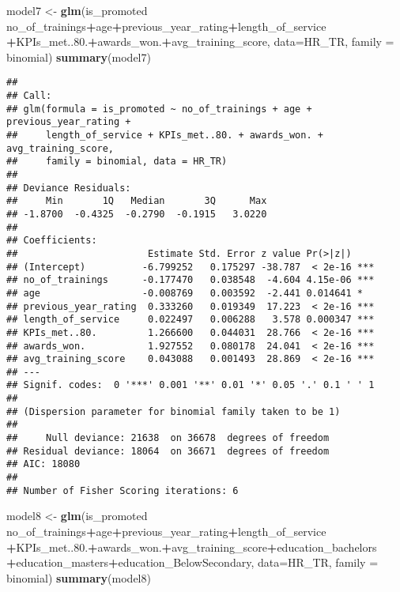 \documentclass[
]{article}
\newenvironment{Shaded}{\begin{snugshade}}{\end{snugshade}}
\newcommand{\DataTypeTok}[1]{\textcolor[rgb]{0.13,0.29,0.53}{#1}}
\newcommand{\FloatTok}[1]{\textcolor[rgb]{0.00,0.00,0.81}{#1}}
\newcommand{\KeywordTok}[1]{\textcolor[rgb]{0.13,0.29,0.53}{\textbf{#1}}}
\newcommand{\NormalTok}[1]{#1}
\newcommand{\OperatorTok}[1]{\textcolor[rgb]{0.81,0.36,0.00}{\textbf{#1}}}
\newcommand{\StringTok}[1]{\textcolor[rgb]{0.31,0.60,0.02}{#1}}
\begin{document}
\begin{Shaded}
\begin{Highlighting}[]
\NormalTok{model7 <-}\StringTok{ }\KeywordTok{glm}\NormalTok{(is_promoted }\OperatorTok{~}\StringTok{ }\NormalTok{no_of_trainings}\OperatorTok{+}\NormalTok{age}\OperatorTok{+}\NormalTok{previous_year_rating}\OperatorTok{+}\NormalTok{length_of_service}
              \OperatorTok{+}\NormalTok{KPIs_met..}\FloatTok{80.}\OperatorTok{+}\NormalTok{awards_won.}\OperatorTok{+}\NormalTok{avg_training_score, }
              \DataTypeTok{data=}\NormalTok{HR_TR, }\DataTypeTok{family =}\NormalTok{ binomial)}
\KeywordTok{summary}\NormalTok{(model7)}
\end{Highlighting}
\end{Shaded}

\begin{verbatim}
## 
## Call:
## glm(formula = is_promoted ~ no_of_trainings + age + previous_year_rating + 
##     length_of_service + KPIs_met..80. + awards_won. + avg_training_score, 
##     family = binomial, data = HR_TR)
## 
## Deviance Residuals: 
##     Min       1Q   Median       3Q      Max  
## -1.8700  -0.4325  -0.2790  -0.1915   3.0220  
## 
## Coefficients:
##                       Estimate Std. Error z value Pr(>|z|)    
## (Intercept)          -6.799252   0.175297 -38.787  < 2e-16 ***
## no_of_trainings      -0.177470   0.038548  -4.604 4.15e-06 ***
## age                  -0.008769   0.003592  -2.441 0.014641 *  
## previous_year_rating  0.333260   0.019349  17.223  < 2e-16 ***
## length_of_service     0.022497   0.006288   3.578 0.000347 ***
## KPIs_met..80.         1.266600   0.044031  28.766  < 2e-16 ***
## awards_won.           1.927552   0.080178  24.041  < 2e-16 ***
## avg_training_score    0.043088   0.001493  28.869  < 2e-16 ***
## ---
## Signif. codes:  0 '***' 0.001 '**' 0.01 '*' 0.05 '.' 0.1 ' ' 1
## 
## (Dispersion parameter for binomial family taken to be 1)
## 
##     Null deviance: 21638  on 36678  degrees of freedom
## Residual deviance: 18064  on 36671  degrees of freedom
## AIC: 18080
## 
## Number of Fisher Scoring iterations: 6
\end{verbatim}

\begin{Shaded}
\begin{Highlighting}[]
\NormalTok{model8 <-}\StringTok{ }\KeywordTok{glm}\NormalTok{(is_promoted }\OperatorTok{~}\StringTok{ }\NormalTok{no_of_trainings}\OperatorTok{+}\NormalTok{age}\OperatorTok{+}\NormalTok{previous_year_rating}\OperatorTok{+}\NormalTok{length_of_service}
              \OperatorTok{+}\NormalTok{KPIs_met..}\FloatTok{80.}\OperatorTok{+}\NormalTok{awards_won.}\OperatorTok{+}\NormalTok{avg_training_score}\OperatorTok{+}\NormalTok{education_bachelors}
              \OperatorTok{+}\NormalTok{education_masters}\OperatorTok{+}\NormalTok{education_BelowSecondary, }
              \DataTypeTok{data=}\NormalTok{HR_TR, }\DataTypeTok{family =}\NormalTok{ binomial)}
\KeywordTok{summary}\NormalTok{(model8)}
\end{Highlighting}
\end{Shaded}
\end{document}

